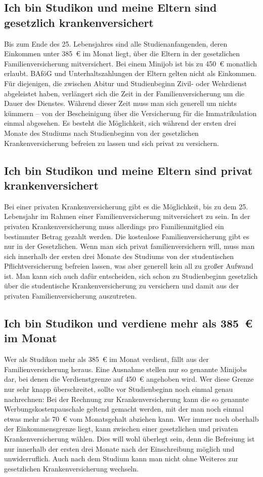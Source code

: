 \subsection*{Ich bin Studikon und meine Eltern sind gesetzlich krankenversichert}

Bis zum Ende des 25. Lebensjahres sind alle Studienanfangenden, 
deren Einkommen unter 385~€ im Monat liegt, über die Eltern in der
gesetzlichen Familienversicherung mitversichert.
Bei einem Minijob ist bis zu 450~€ monatlich erlaubt. BAföG und Unterhaltszahlungen
der Eltern gelten nicht als Einkommen. Für diejenigen, die
zwischen Abitur und Studienbeginn Zivil- oder Wehrdienst abgeleistet
haben, verlängert sich die Zeit in der Familienversicherung um die
Dauer des Dienstes. Während dieser Zeit muss man sich generell um
nichts kümmern – von der Bescheinigung über die Versicherung für die
Immatrikulation einmal abgesehen. Es besteht die Möglichkeit, sich
während der ersten drei Monate des Studiums nach Studienbeginn von der
gesetzlichen Krankenversicherung befreien zu lassen und sich privat zu
versichern.

\subsection*{Ich bin Studikon und meine Eltern sind privat krankenversichert}

Bei einer privaten Krankenversicherung gibt es die Möglichkeit, bis zu
dem 25. Lebensjahr im Rahmen einer Familienversicherung
mitversichert zu sein. In der privaten Krankenversicherung muss
allerdings pro Familienmitglied ein bestimmter Betrag gezahlt
werden. Die kostenlose Familienversicherung gibt es nur in der
Gesetzlichen. Wenn man sich privat familienversichern will, muss man
sich innerhalb der ersten drei Monate des Studiums von der
studentischen Pflichtversicherung befreien lassen, was aber generell
kein all zu großer Aufwand ist. Man kann sich auch dafür entscheiden,
sich schon zu Studienbeginn gesetzlich über die studentische
Krankenversicherung zu versichern und damit aus der privaten
Familienversicherung auszutreten.

\subsection*{Ich bin Studikon und verdiene mehr als 385~€ im Monat}

Wer als Studikon mehr als 385~€ im Monat verdient, fällt aus der
Familienversicherung heraus. Eine Ausnahme stellen nur so genannte
Minijobs dar, bei denen die Verdienstgrenze auf 450~€ angehoben
wird. Wer diese Grenze nur sehr knapp überschreitet, sollte vor
Studienbeginn noch einmal genau nachrechnen: Bei der Rechnung zur
Krankenversicherung kann die so genannte Werbungskostenpauschale
geltend gemacht werden, mit der man noch einmal etwas mehr als 70~€
vom Monatsgehalt abziehen kann. Wer immer noch oberhalb der
Einkommensgrenze liegt, kann zwischen einer gesetzlichen und privaten
Krankenversicherung wählen. Dies will wohl überlegt sein, denn die Befreiung
ist nur innerhalb der ersten drei Monate nach der Einschreibung möglich und
unwiderruflich. Auch nach dem Studium kann man nicht ohne Weiteres zur gesetzlichen
Krankenversicherung wechseln.


